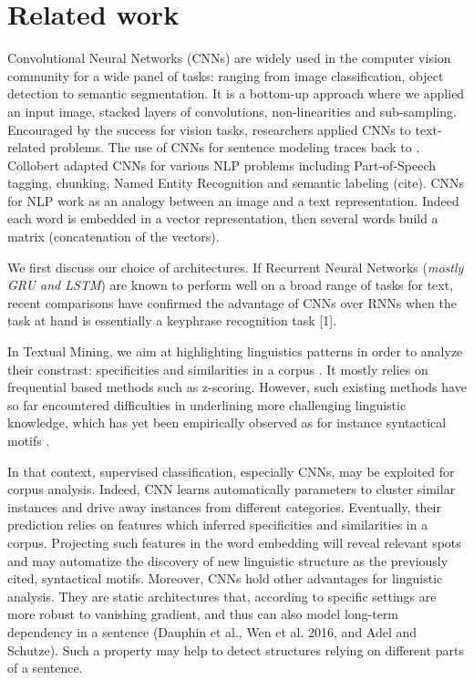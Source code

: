 \section{Related work}

Convolutional Neural Networks (CNNs) are widely used in the computer vision community for a wide panel of tasks: ranging from image classification, 
object detection to semantic segmentation. It is a bottom-up approach where we applied an input image, stacked layers of convolutions, non-linearities and sub-sampling.
Encouraged by the success for vision tasks, researchers applied CNNs to text-related problems. The use of CNNs for sentence modeling traces back to \cite{Coll:08}. Collobert adapted 
CNNs for various NLP problems including Part-of-Speech tagging, chunking, Named Entity Recognition and semantic labeling (cite). 
CNNs for NLP work as an analogy between an image and a text representation. Indeed each word is embedded in a vector representation, then several words build a matrix (concatenation of the vectors). 


We first discuss our choice of architectures. 
If Recurrent Neural Networks (\textit{mostly GRU and LSTM}) are known to perform well on a broad range of tasks for text, recent comparisons have confirmed the advantage of CNNs 
over RNNs when the task at hand is essentially a keyphrase recognition task [1]. 

In Textual Mining, we aim at highlighting linguistics patterns in order to analyze their constrast: specificities and similarities in a corpus \cite{Fel:07, Leb:98}. It mostly relies on frequential based methods such as z-scoring. However, such existing methods have so far encountered difficulties in underlining more challenging linguistic knowledge, which has yet been empirically observed as for instance syntactical motifs \cite{mellet:09}.

In that context, supervised classification, especially CNNs, may be exploited for corpus analysis. Indeed, CNN learns automatically parameters to cluster similar instances and drive away instances from different categories. Eventually, their prediction relies on features which inferred specificities and similarities in a corpus. Projecting such features in the word embedding will reveal relevant spots and may automatize the discovery of new linguistic structure as the previously cited, syntactical motifs. Moreover, CNNs hold other advantages for linguistic analysis. They are static architectures that, according to specific settings are more robust to vanishing gradient, and thus can also model long-term dependency in a sentence (Dauphin et al., Wen et al. 2016, and Adel and Schutze). Such a property may help to detect structures relying on different parts of a sentence.

